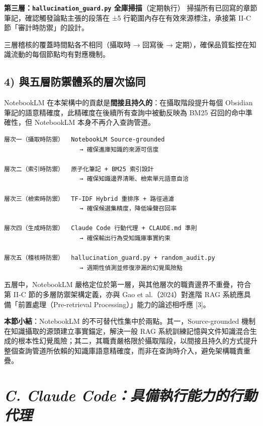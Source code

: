 \textbf{第三層：\texttt{hallucination\_guard.py} 全庫掃描}（定期執行）
掃描所有已回寫的章節筆記，確認觸發論點主張的段落在 ±5
行範圍內存在有效來源標注，承接第 II-C 節「審計時防禦」的設計。

三層稽核的覆蓋時間點各不相同（攝取時 → 回寫後 →
定期），確保品質監控在知識流動的每個節點均有對應機制。

\subsection{4)
與五層防禦體系的層次協同}\label{ux8207ux4e94ux5c64ux9632ux79a6ux9ad4ux7cfbux7684ux5c64ux6b21ux5354ux540c}

NotebookLM 在本架構中的貢獻是\textbf{間接且持久的}：在攝取階段提升每個
Obsidian 筆記的語意精確度，此精確度在後續所有查詢中被動反映為 BM25
召回的命中準確性，但 NotebookLM 本身不再介入查詢管道。

\begin{verbatim}
層次一（攝取時防禦）  NotebookLM Source-grounded
                     → 確保進庫知識的來源可信度

層次二（索引時防禦）  原子化筆記 + BM25 索引設計
                     → 確保知識邊界清晰、檢索單元語意自洽

層次三（檢索時防禦）  TF-IDF Hybrid 重排序 + 路徑過濾
                     → 確保候選集精度，降低噪聲召回率

層次四（生成時防禦）  Claude Code 行動代理 + CLAUDE.md 準則
                     → 確保輸出行為受知識庫事實約束

層次五（稽核時防禦）  hallucination_guard.py + random_audit.py
                     → 週期性偵測並修復滲漏的幻覺風險點
\end{verbatim}

五層中，NotebookLM 嚴格定位於第一層，與其他層次的職責邊界不重疊，符合第
II-C 節的多層防禦架構定義，亦與 Gao et al.（2024）對進階 RAG
系統應具備「前置處理（Pre-retrieval Processing）」能力的論述相呼應
{[}3{]}。

\textbf{本節小結}：NotebookLM
的不可替代性集中於兩點。其一，Source-grounded
機制在知識攝取的源頭建立事實錨定，解決一般 RAG
系統訓練記憶與文件知識混合生成的根本性幻覺風險；其二，其職責嚴格限於攝取階段，以間接且持久的方式提升整個查詢管道所依賴的知識庫語意精確度，而非在查詢時介入，避免架構職責重疊。

\section{\texorpdfstring{\emph{C. Claude
Code：具備執行能力的行動代理}}{C. Claude Code：具備執行能力的行動代理}}\label{c.-claude-codeux5177ux5099ux57f7ux884cux80fdux529bux7684ux884cux52d5ux4ee3ux7406}

